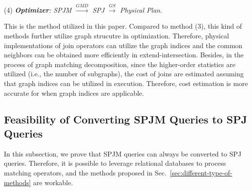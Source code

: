 (4) \emph{\textbf{Optimizer}: SPJM $\xrightarrow{GMD}$ SPJ $\xrightarrow{GS}$ Physical Plan}.

This is the method utilized in this paper.
Compared to method (3), this kind of methods further utilize graph strucutre in optimization.
Therefore, physical implementations of join operators can utilize the graph indices and the common neighbors can be obtained more efficiently in extend-intersection.
Besides, in the process of graph matching decomposition, since the higher-order statistics are utilized (i.e., the number of subgraphs), the cost of joins are estimated assuming that graph indices can be utilized in execution.
Therefore, cost estimation is more accurate for when graph indices are applicable.

\subsection{Feasibility of Converting SPJM Queries to SPJ Queries}
In this subsection, we prove that SPJM queries can always be converted to SPJ queries.
Therefore, it is possible to leverage relational databases to process matching operators, and the methods proposed in Sec.~\ref{sec:different-type-of-methods} are workable.

